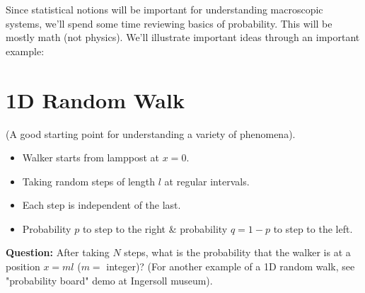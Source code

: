 \documentclass[11pt]{article}
\begin{document}
Since statistical notions will be important for understanding macroscopic systems, we'll spend some time reviewing basics of probability. This will be mostly math (not physics). We'll illustrate important ideas through an important example:

\section*{1D Random Walk}
(A good starting point for understanding a variety of phenomena).

\begin{center}
\end{center}

\begin{itemize}
    \item Walker starts from lamppost at $x=0$.
    \item Taking random steps of length $l$ at regular intervals.
    \item Each step is independent of the last.
    \item Probability $p$ to step to the right \& probability $q=1-p$ to step to the left.
\end{itemize}

\textbf{Question:} After taking $N$ steps, what is the probability that the walker is at a position $x=ml$ ($m=$ integer)?
(For another example of a 1D random walk, see "probability board" demo at Ingersoll museum).
\end{document}
